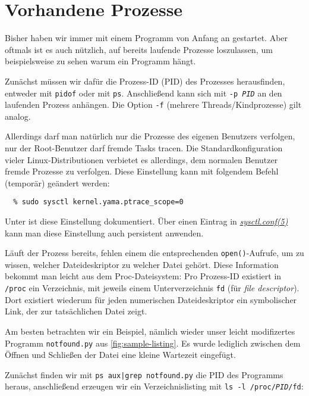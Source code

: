 \section{Vorhandene Prozesse}

Bisher haben wir \strace{} immer mit einem Programm von Anfang an gestartet. Aber oftmals
ist es auch nützlich, \strace{} auf bereits laufende Prozesse loszulassen, um beispielsweise zu
sehen warum ein Programm hängt.

Zunächst müssen wir dafür die Prozess-ID (PID) des Prozesses herausfinden, entweder mit
\texttt{pidof} oder mit \texttt{ps}. Anschließend kann sich \strace{} mit \texttt{-p \emph{PID}}
an den laufenden Prozess anhängen. Die Option \texttt{-f} (mehrere Threads/Kindprozesse) gilt
analog.


Allerdings darf man natürlich nur die Prozesse des eigenen Benutzers verfolgen, nur der
Root-Benutzer darf fremde Tasks tracen. Die Standardkonfiguration vieler Linux-Distributionen
verbietet es allerdings, dem normalen Benutzer fremde Prozesse zu verfolgen. Diese Einstellung
kann mit folgendem Befehl (temporär) geändert werden:

\begin{verbatim}
  % sudo sysctl kernel.yama.ptrace_scope=0
\end{verbatim}

Unter \cite{yama} ist diese Einstellung dokumentiert. Über einen Eintrag in
\href{http://man7.org/linux/man-pages/man5/sysctl.conf.5.html}{\emph{sysctl.conf(5)}} kann man
diese Einstellung auch persistent anwenden.



Läuft der Prozess bereits, fehlen einem die entsprechenden \texttt{open()}-Aufrufe, um zu wissen,
welcher Dateideskriptor zu welcher Datei gehört. Diese Information bekommt man leicht aus dem
Proc-Dateisystem: Pro Prozess-ID existiert in \texttt{/proc} ein Verzeichnis, mit jeweils einem
Unterverzeichnis \texttt{fd} (für \emph{file descriptor}). Dort existiert wiederum für jeden
numerischen Dateideskriptor ein symbolischer Link, der zur tatsächlichen Datei zeigt.

Am besten betrachten wir ein Beispiel, nämlich wieder unser leicht modifizertes Programm
\texttt{notfound.py} aus \autoref{fig:sample-listing}. Es wurde lediglich zwischen dem Öffnen
und Schließen der Datei eine kleine Wartezeit eingefügt.

Zunächst finden wir mit \texttt{ps aux|grep notfound.py} die PID des Programms heraus, anschließend
erzeugen wir ein Verzeichnislisting mit \texttt{ls -l /proc/\emph{PID}/fd}:

